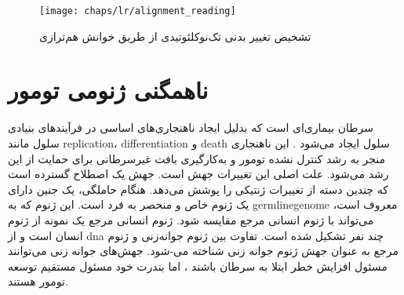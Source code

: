 \begin{figure}[!ht]
	\centerline{\texttt{[image: chaps/lr/alignment\_reading]}}
	\caption{تشخیص تغییر بدنی تک‌نوکلئوتیدی از طریق خوانش هم‌ترازی}
	\label{fig:ch_lr:alignment_reading}
\end{figure}



\section{ناهمگنی ژنومی تومور}

سرطان بیماری‌ای است که بدلیل ایجاد ناهنجاری‌های اساسی در فرآیند‌های بنیادی سلول مانند \gls{replication}، \gls{differentiation}  و \gls{death} سلول  ایجاد می‌شود \cite{hanahan2011hallmarks}. این ناهنجاری منجر به رشد کنترل نشده تومور و به‌کارگیری بافت غیرسرطانی برای حمایت از این رشد می‌شود. علت اصلی این تغییرات جهش است. جهش یک اصطلاح گسترده است که چندین دسته از تغییرات ژنتیکی را پوشش می‌دهد. هنگام حاملگی، یک جنین دارای یک ژنوم خاص و منحصر به فرد است. این ژنوم که به \gls{germlinegenome} معروف است، می‌تواند با ژنوم انسانی مرجع مقایسه شود. ژنوم انسانی مرجع یک نمونه از ژنوم انسان است و از \gls{dna} چند نفر تشکیل شده است. تفاوت بین ژنوم جوانه‌زنی و ژنوم مرجع به عنوان جهش ژنوم جوانه زنی شناخته می-شود. جهش‌های جوانه زنی می‌توانند مسئول افزایش خطر ابتلا به سرطان باشند \cite{stewart2017world}، اما بندرت خود مسئول مستقیم توسعه تومور هستند. 




